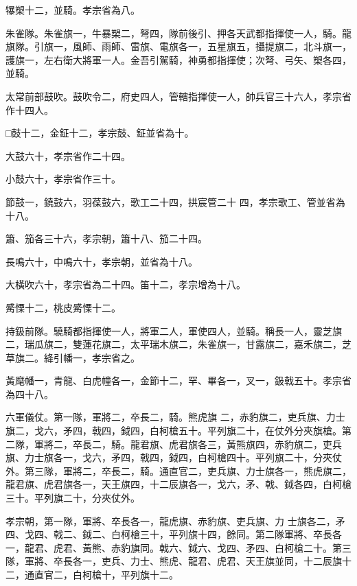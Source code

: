 \begin{pinyinscope}
 犦槊十二，並騎。孝宗省為八。



 朱雀隊。朱雀旗一，牛暴槊二，弩四，隊前後引、押各天武都指揮使一人，騎。龍旗隊。引旗一，風師、雨師、雷旗、電旗各一，五星旗五，攝提旗二，北斗旗一，護旗一，左右衛大將軍一人。金吾引駕騎，神勇都指揮使；次弩、弓矢、槊各四，並騎。



 太常前部鼓吹。鼓吹令二，府史四人，管轄指揮使一人，帥兵官三十六人，孝宗省作十四人。



 □鼓十二，金鉦十二，孝宗鼓、鉦並省為十。



 大鼓六十，孝宗省作二十四。



 小鼓六十，孝宗省作三十。



 節鼓一，鐃鼓六，羽葆鼓六，歌工二十四，拱宸管二十
 四，孝宗歌工、管並省為十八。



 簫、笳各三十六，孝宗朝，簫十八、笳二十四。



 長鳴六十，中鳴六十，孝宗朝，並省為十八。



 大橫吹六十，孝宗省為二十四。笛十二，孝宗增為十八。



 觱慄十二，桃皮觱慄十二。



 持鈒前隊。驍騎都指揮使一人，將軍二人，軍使四人，並騎。稱長一人，靈芝旗二，瑞瓜旗二，雙蓮花旗二，太平瑞木旗二，朱雀旗一，甘露旗二，嘉禾旗二，芝草旗二。絳引幡一，孝宗省之。



 黃麾幡一，青龍、白虎幢各一，金節十二，罕、畢各一，叉一，鈒戟五十。孝宗省為四十八。



 六軍儀仗。第一隊，軍將二，卒長二，騎。熊虎旗
 二，赤豹旗二，吏兵旗、力士旗二，戈六，矛四，戟四，鉞四，白柯槍五十。平列旗二十，在仗外分夾旗槍。第二隊，軍將二，卒長二，騎。龍君旗、虎君旗各三，黃熊旗四，赤豹旗二，吏兵旗、力士旗各一，戈六，矛四，戟四，鉞四，白柯槍四十。平列旗二十，分夾仗外。第三隊，軍將二，卒長二，騎。通直官二，吏兵旗、力士旗各一，熊虎旗二，龍君旗、虎君旗各一，天王旗四，十二辰旗各一，戈六，矛、戟、鉞各四，白柯槍三十。平列旗二十，分夾仗外。



 孝宗朝，第一隊，軍將、卒長各一，龍虎旗、赤豹旗、吏兵旗、力
 士旗各二，矛四、戈四、戟二、鉞二、白柯槍三十，平列旗十四，餘同。第二隊軍將、卒長各一，龍君、虎君、黃熊、赤豹旗同。戟六、鉞六、戈四、矛四、白柯槍二十。第三隊，軍將、卒長各一，吏兵、力士、熊虎、龍君、虎君、天王旗並同，十二辰旗十二，通直官二，白柯槍十，平列旗十二。




\end{pinyinscope}
